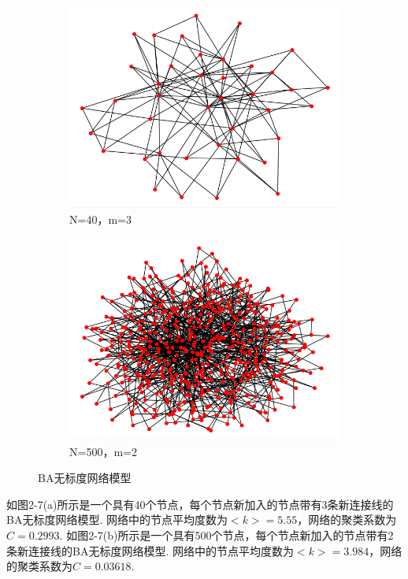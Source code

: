 \documentclass[bachelor,adobefonts]{jnuthesis}
\begin{document}
\begin{figure}[h!]
  \centering 
  \begin{subfigure}[b]{0.49\linewidth}
    \includegraphics[width=\linewidth]{WBA-1.png}
    \caption{N=40，m=3}
  \end{subfigure}
  \begin{subfigure}[b]{0.49\linewidth}
    \includegraphics[width=\linewidth]{WBA-2.png}
    \caption{N=500，m=2}
  \end{subfigure}
  \caption{BA无标度网络模型}
\end{figure}

如图2-7(a)所示是一个具有40个节点，每个节点新加入的节点带有3条新连接线的BA无标度网络模型.
网络中的节点平均度数为$<k> = 5.55$，网络的聚类系数为$C = 0.2993$.
如图2-7(b)所示是一个具有500个节点，每个节点新加入的节点带有2条新连接线的BA无标度网络模型.
网络中的节点平均度数为$<k> = 3.984$，网络的聚类系数为$C = 0.03618$.
\end{document}
